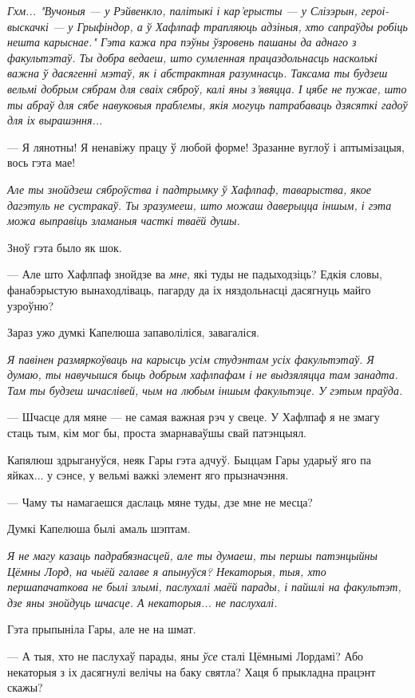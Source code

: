 \emph{Гхм... "Вучоныя --- у Рэйвенкло, палітыкі і кар'ерысты --- у Слізэрын, героі-выскачкі --- у
Грыфіндор, а ў Хафлпаф трапляюць адзіныя, хто сапраўды робіць нешта карыснае." Гэта 
кажа пра пэўны ўзровень пашаны да аднаго з факультэтаў. Ты добра ведаеш, што 
сумленная працаздольнасць насколькі важна ў дасягенні мэтаў, як і абстрактная разумнасць.
Таксама ты будзеш вельмі добрым сябрам для сваіх сяброў, калі яны з'явяцца. 
І цябе не пужае, што ты абраў для сябе навуковыя праблемы, якія могуць 
патрабаваць дзясяткі гадоў для іх вырашэння...}

--- Я лянотны! Я ненавіжу працу ў любой форме! 
Зразанне вуглоў і аптымізацыя, вось гэта мае!

\emph{Але ты знойдзеш сяброўства і падтрымку ў Хафлпаф, таварыства, якое 
дагэтуль не сустракаў. Ты зразумееш, што можаш даверыцца іншым, і гэта 
можа выправіць зламаныя часткі тваёй душы.}

Зноў гэта было як шок.

--- Але што Хафлпаф знойдзе ва \emph{мне}, які туды не падыходзіць? Едкія словы, 
фанабэрыстую вынаходліваць, пагарду да іх няздольнасці дасягнуць майго узроўню?

Зараз ужо думкі Капелюша запаволіліся, завагаліся.

\emph{Я павінен размяркоўваць на карысць усім студэнтам усіх факультэтаў.
Я думаю, ты навучышся быць добрым хафлпафам і не выдзяляцца там занадта. Там ты 
будзеш шчаслівей, чым на любым іншым факультэце. У гэтым праўда.}

--- Шчасце для мяне --- не самая важная рэч у свеце. У Хафлпаф я не змагу 
стаць тым, кім мог бы, проста змарнаваўшы свай патэнцыял.

Капялюш здрыгануўся, неяк Гары гэта адчуў. Быццам Гары ударыў яго па яйках... 
у сэнсе, у вельмі важкі элемент яго прызначэння.

--- Чаму ты намагаешся даслаць мяне туды, дзе мне не месца?

Думкі Капелюша былі амаль шэптам.

\emph{Я не магу казаць падрабязнасцей, але ты думаеш, ты першы патэнцыйны 
Цёмны Лорд, на чыёй галаве я апынуўся? Некаторыя, тыя, хто першапачаткова не былі 
злымі, паслухалі маёй парады, і пайшлі на факультэт, дзе яны знойдуць шчасце.
А некаторыя... не паслухалі.}

Гэта прыпыніла Гары, але не на шмат.

--- А тыя, хто не паслухаў парады, яны \emph{ўсе} сталі Цёмнымі Лордамі? 
Або некаторыя з іх дасягнулі велічы на баку святла? Хаця б прыкладна працэнт скажы?

